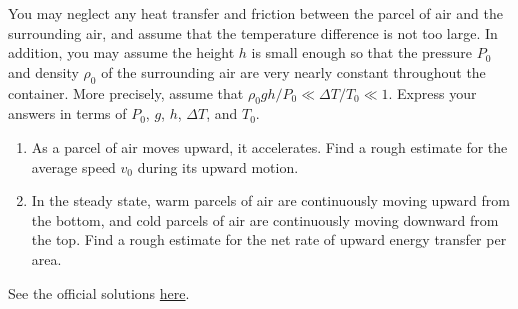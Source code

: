 \documentclass[11pt]{scrartcl}
\newcommand{\officialsol}[1]{See the official solutions \href{#1}{here}.}
\begin{document}
\begin{prob}[USAPhO 2021/B2]
\begin{anum}
You may neglect any heat transfer and friction between the parcel of air and the surrounding air,
and assume that the temperature difference is not too large. In addition, you may assume the
height $h$ is small enough so that the pressure $P_0$ and density $\rho_0$ of the surrounding air are very
nearly constant throughout the container. More precisely, assume that $\rho_0gh/P_0 \ll \Delta T /T_0 \ll 1$.
Express your answers in terms of $P_0$, $g$, $h$, $\Delta T$, and $T_0$.
\begin{enumerate}[label=\roman*.]
    \item As a parcel of air moves upward, it accelerates. Find a rough estimate for the average speed
$v_0$ during its upward motion.
\item In the steady state, warm parcels of air are continuously moving upward from the bottom, and
cold parcels of air are continuously moving downward from the top. Find a rough estimate
for the net rate of upward energy transfer per area.
\end{enumerate}
    \end{anum}
\end{prob}
\begin{sol}
    \officialsol{https://aapt.org/Common2022/upload/2021-USAPhO_Solutions_v3.pdf\#page=15}
\end{sol}
\end{document}
